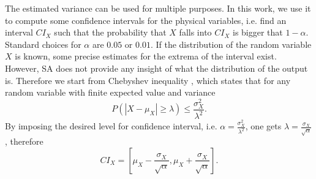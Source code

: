 The estimated variance can be used for multiple purposes. In this work, we use it to compute some confidence intervals for the physical variables, i.e. find an interval $CI_X$ such that the probability that $X$ falls into $CI_X$ is bigger that $1-\alpha$. Standard choices for $\alpha$ are $0.05$ or $0.01$. If the distribution of the random variable $X$ is known, some precise estimates for the extrema of the interval exist. However, SA does not provide any insight of what the distribution of the output is. Therefore we start from Chebyshev inequality \cite{jacod2012probability}, which states that for any random variable with finite expected value and variance
\[
P(|X-\mu_X| \geq \lambda) \leq \frac{\sigma^2_X}{\lambda^2}.
\]
By imposing the desired level for confidence interval, i.e. $\alpha = \frac{\sigma^2_X}{\lambda^2}$, one gets $\lambda = \frac{\sigma_X}{\sqrt{\alpha}}$, therefore
\begin{equation}
CI_X = \left[\mu_X - \frac{\sigma_X}{\sqrt{\alpha}}, \mu_X + \frac{\sigma_X}{\sqrt{\alpha}}\right].
\label{CI}
\end{equation}



%

